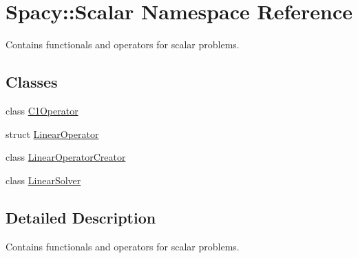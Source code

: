 \hypertarget{namespaceSpacy_1_1Scalar}{}\section{Spacy\+:\+:Scalar Namespace Reference}
\label{namespaceSpacy_1_1Scalar}


Contains functionals and operators for scalar problems.  


\subsection*{Classes}
\begin{DoxyCompactItemize}
\item 
class \hyperlink{classSpacy_1_1Scalar_1_1C1Operator}{C1\+Operator}
\item 
struct \hyperlink{structSpacy_1_1Scalar_1_1LinearOperator}{Linear\+Operator}
\item 
class \hyperlink{classSpacy_1_1Scalar_1_1LinearOperatorCreator}{Linear\+Operator\+Creator}
\item 
class \hyperlink{classSpacy_1_1Scalar_1_1LinearSolver}{Linear\+Solver}
\end{DoxyCompactItemize}


\subsection{Detailed Description}
Contains functionals and operators for scalar problems. 